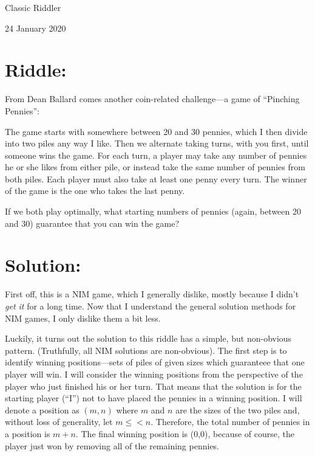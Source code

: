 \documentclass{article}
\begin{document}
\pagestyle{empty} %

\begin{center}
{\LARGE Classic Riddler}

\vspace{0.15in}

{\Large 24 January 2020}
\end{center}


\section*{Riddle:}

From Dean Ballard comes another coin-related challenge---a game of ``Pinching Pennies'':

The game starts with somewhere between 20 and 30 pennies, which I then divide into two piles any way I like.
Then we alternate taking turns, with you first, until someone wins the game.
For each turn, a player may take any number of pennies he or she likes from either pile, or instead take the same number of pennies from both piles.
Each player must also take at least one penny every turn.
The winner of the game is the one who takes the last penny.

If we both play optimally, what starting numbers of pennies (again, between 20 and 30) guarantee that you can win the game?


\section*{Solution:}

First off, this is a NIM game, which I generally dislike, mostly because I didn't \textit{get it} for a long time.
Now that I understand the general solution methods for NIM games, I only dislike them a bit less.

Luckily, it turns out the solution to this riddle has a simple, but non-obvious pattern.
(Truthfully, all NIM solutions are non-obvious).
The first step is to identify winning positions---sets of piles of given sizes which guaranteee that one player will win.
I will consider the winning positions from the perspective of the player who just finished his or her turn.
That means that the solution is for the starting player (``I'') not to have placed the pennies in a winning position.
I will denote a position as $(m,n)$ where $m$ and $n$ are the sizes of the two piles and, without loss of generality, let $m\leq <n$.
Therefore, the total number of pennies in a position is $m+n$.
The final winning position is (0,0), because of course, the player just won by removing all of the remaining pennies.
\end{document}
